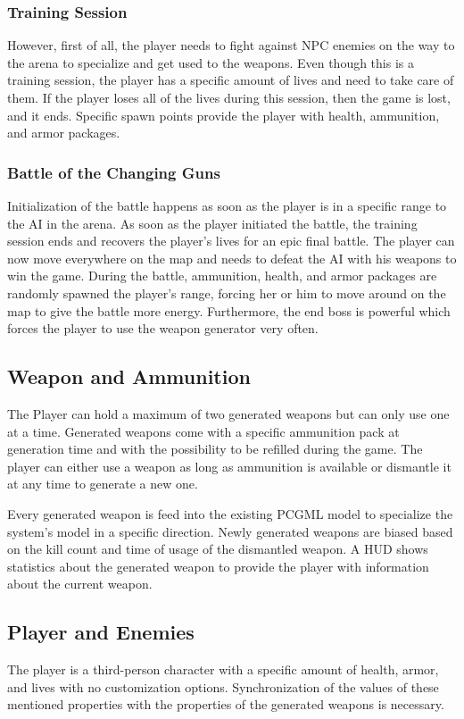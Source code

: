 \documentclass[MGS,Master,english]{twbook}%
\begin{document}
\subsubsection{Training Session}
However, first of all, the player needs to fight against NPC enemies on the way to the arena to specialize and get used to the weapons. Even though this is a training session, the player has a specific amount of lives and need to take care of them. If the player loses all of the lives during this session, then the game is lost, and it ends. Specific spawn points provide the player with health, ammunition, and armor packages.

\subsubsection{Battle of the Changing Guns}
Initialization of the battle happens as soon as the player is in a specific range to the AI in the arena. As soon as the player initiated the battle, the training session ends and recovers the player's lives for an epic final battle. The player can now move everywhere on the map and needs to defeat the AI with his weapons to win the game. During the battle, ammunition, health, and armor packages are randomly spawned the player's range, forcing her or him to move around on the map to give the battle more energy. Furthermore, the end boss is powerful which forces the player to use the weapon generator very often. 

\subsection{Weapon and Ammunition}
The Player can hold a maximum of two generated weapons but can only use one at a time. Generated weapons come with a specific ammunition pack at generation time and with the possibility to be refilled during the game. The player can either use a weapon as long as ammunition is available or dismantle it at any time to generate a new one.

Every generated weapon is feed into the existing PCGML model to specialize the system’s model in a specific direction. Newly generated weapons are biased based on the kill count and time of usage of the dismantled weapon. A \ac{HUD} shows statistics about the generated weapon to provide the player with information about the current weapon. 

\subsection{Player and Enemies}
The player is a third-person character with a specific amount of health, armor, and lives with no customization options. Synchronization of the values of these mentioned properties with the properties of the generated weapons is necessary.
\end{document}
